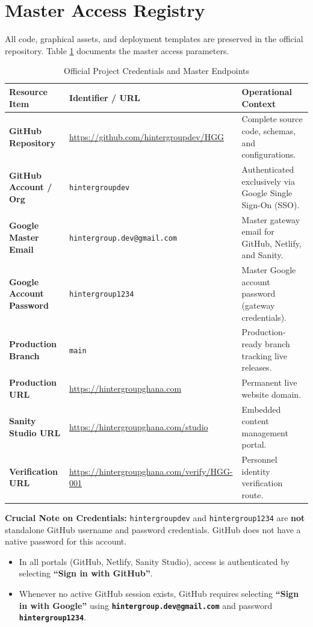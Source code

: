 \documentclass[11pt,a4paper,oneside]{book}
\begin{document}
\section{Master Access Registry}
All code, graphical assets, and deployment templates are preserved in the official repository. Table \ref{tab:credentials} documents the master access parameters.

\begin{table}[H]
\centering
\small
\begin{tabularx}{\textwidth}{lXX}
  \toprule
  \textbf{Resource Item} & \textbf{Identifier / URL} & \textbf{Operational Context} \\
  \midrule
  \textbf{GitHub Repository} & \url{https://github.com/hintergroupdev/HGG} & Complete source code, schemas, and configurations. \\
  \textbf{GitHub Account / Org} & \texttt{hintergroupdev} & Authenticated exclusively via Google Single Sign-On (SSO). \\
  \textbf{Google Master Email} & \texttt{hintergroup.dev@gmail.com} & Master gateway email for GitHub, Netlify, and Sanity. \\
  \textbf{Google Account Password} & \texttt{hintergroup1234} & Master Google account password (gateway credentials). \\
  \textbf{Production Branch} & \texttt{main} & Production-ready branch tracking live releases. \\
  \textbf{Production URL} & \url{https://hintergroupghana.com} & Permanent live website domain. \\
  \textbf{Sanity Studio URL} & \url{https://hintergroupghana.com/studio} & Embedded content management portal. \\
  \textbf{Verification URL} & \url{https://hintergroupghana.com/verify/HGG-001} & Personnel identity verification route. \\
  \bottomrule
\end{tabularx}
\caption{Official Project Credentials and Master Endpoints}
\label{tab:credentials}
\end{table}

\begin{goldbox}
\textbf{Crucial Note on Credentials:} \texttt{hintergroupdev} and \texttt{hintergroup1234} are \textbf{not} standalone GitHub username and password credentials. GitHub does not have a native password for this account.
\begin{itemize}[leftmargin=*]
  \item In all portals (GitHub, Netlify, Sanity Studio), access is authenticated by selecting \textbf{``Sign in with GitHub''}.
  \item Whenever no active GitHub session exists, GitHub requires selecting \textbf{``Sign in with Google''} using \textbf{\texttt{hintergroup.dev@gmail.com}} and password \textbf{\texttt{hintergroup1234}}.
\end{itemize}
\end{goldbox}
\end{document}
